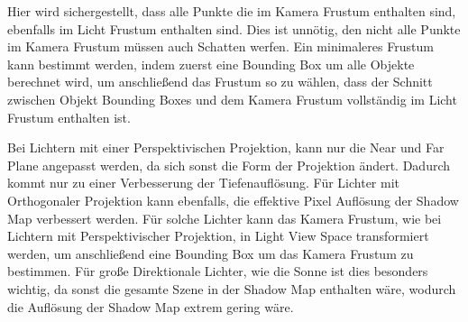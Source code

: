 Hier wird sichergestellt, dass alle Punkte die im Kamera Frustum enthalten sind, ebenfalls im
Licht Frustum enthalten sind. Dies ist unnötig, den nicht alle Punkte im Kamera Frustum müssen auch Schatten werfen.
Ein minimaleres Frustum kann bestimmt werden, indem zuerst eine Bounding Box um alle Objekte berechnet wird,
um anschließend das Frustum so zu wählen, 
dass der Schnitt zwischen Objekt Bounding Boxes und dem Kamera Frustum vollständig im
Licht Frustum enthalten ist.
\par
Bei Lichtern mit einer Perspektivischen Projektion, kann nur die Near und Far Plane angepasst werden, da sich sonst die Form der Projektion
ändert. 
Dadurch kommt nur zu einer Verbesserung der Tiefenauflösung.
Für Lichter mit Orthogonaler Projektion kann ebenfalls, die effektive Pixel Auflösung der Shadow Map verbessert werden.
Für solche Lichter kann das Kamera Frustum, wie bei Lichtern mit Perspektivischer Projektion, in Light View Space 
transformiert werden, um anschließend eine Bounding Box um das Kamera Frustum zu bestimmen. 
Für große Direktionale Lichter, wie die Sonne ist dies besonders wichtig, da sonst die gesamte Szene in der Shadow Map enthalten wäre,
wodurch die Auflösung der Shadow Map extrem gering wäre.

